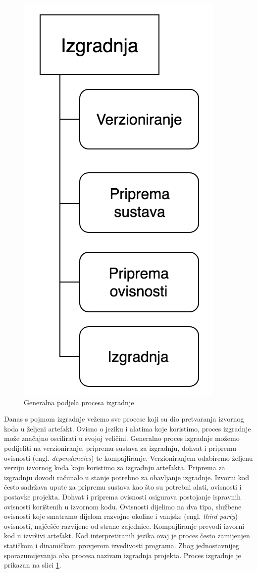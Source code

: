 \documentclass[times, utf8, diplomski, numeric]{fer}
\newcommand{\eng}[1]{(engl. \textit{#1})}
\begin{document}
\begin{figure}
\centering
\includegraphics[scale=0.5]{BuildProcess}
\caption{Generalna podjela procesa izgradnje}
\label{fig:BuildProcess}
\end{figure}

Danas s pojmom izgradnje vežemo sve procese koji su dio pretvaranja izvornog koda u željeni artefakt. Ovisno o jeziku i alatima koje koristimo, proces izgradnje može značajno oscilirati u svojoj veličini. Generalno proces izgradnje možemo podijeliti na verzioniranje, pripremu sustava za izgradnju, dohvat i pripremu ovisnosti \eng{dependancies} te kompajliranje. Verzioniranjem odabiremo željenu verziju izvornog koda koju koristimo za izgradnju artefakta. Priprema za izgradnju dovodi računalo u stanje potrebno za obavljanje izgradnje. Izvorni kod često sadržava upute za pripremu sustava kao što su potrebni alati, ovisnosti i postavke projekta. Dohvat i priprema ovisnosti osigurava postojanje ispravnih ovisnosti korištenih u izvornom kodu. Ovisnosti dijelimo na dva tipa, službene ovisnosti koje smatramo dijelom razvojne okoline i vanjske \eng{third party} ovisnosti, najčešće razvijene od strane zajednice. Kompajliranje prevodi izvorni kod u izvršivi artefakt. Kod interpretiranih jezika ovaj je proces često zamijenjen statičkom i dinamičkom provjerom izvedivosti programa. Zbog jednostavnijeg sporazumijevanja oba procesa nazivam izgradnja projekta. Proces izgradnje je prikazan na slici \ref{fig:BuildProcess}.
\end{document}

